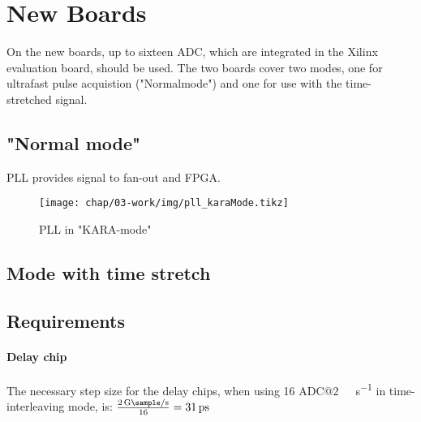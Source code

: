 \newpage

\section{New Boards}
On the new boards, up to sixteen ADC, which are integrated in the Xilinx evaluation board, should be used. The two boards cover two modes, one for ultrafast pulse acquistion ("Normalmode") and one for use with the time-stretched signal.
\subsection{"Normal mode"}
PLL provides signal to fan-out and FPGA.
\begin{figure}[H]
	\centering
	\texttt{[image: chap/03-work/img/pll\_karaMode.tikz]}
	\caption{PLL in "KARA-mode"}
	\label{fig:pll}
\end{figure}

\subsection{Mode with time stretch}


\subsection{Requirements}

\paragraph{Delay chip}
The necessary step size for the delay chips, when using 16 ADC@\SI{2}{\giga \sample \per \second} in time-interleaving mode, is: $\frac{\SI{2}{\giga \sample \per \second}}{16} = \SI{31}{\pico \second}$
